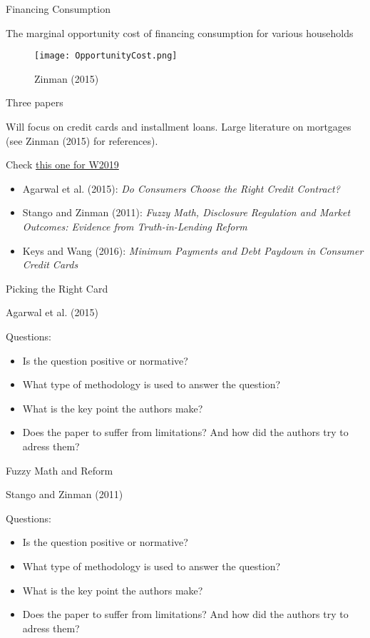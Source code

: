 \documentclass[theme=default]{beamer}
\begin{document}
\begin{frame}{Financing Consumption}

The marginal opportunity cost of financing consumption for various households
\begin{figure}
\texttt{[image: OpportunityCost.png]}
\caption{Zinman (2015) }
\end{figure}
\end{frame}


\begin{frame}{Three papers}

Will focus on credit cards and installment loans. Large literature on mortgages (see Zinman (2015) for references). 

Check \href{http://www.nber.org/papers/w24881}{this one for W2019}

\begin{itemize}
\item Agarwal et al. (2015): \textit{Do Consumers Choose the Right Credit Contract?}
\item Stango and Zinman (2011): \textit{Fuzzy Math, Disclosure Regulation and Market Outcomes: Evidence from Truth-in-Lending Reform}
\item Keys and Wang (2016): \textit{Minimum Payments and Debt Paydown in Consumer Credit Cards}

\end{itemize}

\end{frame}

\begin{frame}{Picking the Right Card}

Agarwal et al. (2015)

Questions: 
\begin{itemize}
\item Is the question positive or normative?
\item What type of methodology is used to answer the question?
\item What is the key point the authors make?
\item Does the paper to suffer from limitations? And how did the authors try to adress them?
\end{itemize}


\end{frame}


\begin{frame}{Fuzzy Math and Reform}

Stango and Zinman (2011)

Questions: 
\begin{itemize}
\item Is the question positive or normative?
\item What type of methodology is used to answer the question?
\item What is the key point the authors make?
\item Does the paper to suffer from limitations? And how did the authors try to adress them?
\end{itemize}

\end{frame}
\end{document}
